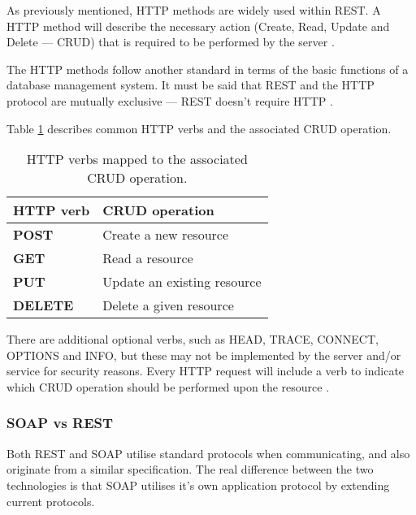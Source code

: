 As previously mentioned, HTTP methods are widely used within REST. A HTTP 
method will describe the necessary action (Create, Read, Update and Delete --- 
CRUD) that is required to be performed by the server \citep{dospinescu13}.

The HTTP methods follow another standard in terms of the basic functions of a 
database management system. It must be said that REST and the HTTP protocol are
mutually exclusive --- REST doesn't require HTTP \citep{dospinescu13}. 

Table \ref{tbl:http_crud} describes common HTTP verbs and the associated CRUD 
operation. 

\begin{table}[h!]
  \begin{center}
    \begin{tabular}{|ll|}
    \hline
    \textbf{HTTP verb} & \textbf{CRUD operation}      \\ \hline
    \textbf{POST}      & Create a new resource        \\
    \textbf{GET}       & Read a resource              \\
    \textbf{PUT}       & Update an existing resource  \\
    \textbf{DELETE}    & Delete a given resource      \\ \hline
    \end{tabular}
    \caption{HTTP verbs mapped to the associated CRUD operation.}
    \label{tbl:http_crud}
  \end{center}
\end{table}

There are additional optional verbs, such as HEAD, TRACE, CONNECT, OPTIONS and 
INFO, but these may not be implemented by the server and/or service for security
reasons. Every HTTP request will include a verb to indicate which CRUD operation
should be performed upon the resource \citep{dospinescu13}. 


\subsubsection{SOAP vs REST}

Both REST and SOAP utilise standard protocols when communicating, and also 
originate from a similar specification. The real difference between the two 
technologies is that SOAP utilises it's own application protocol by extending 
current protocols.

